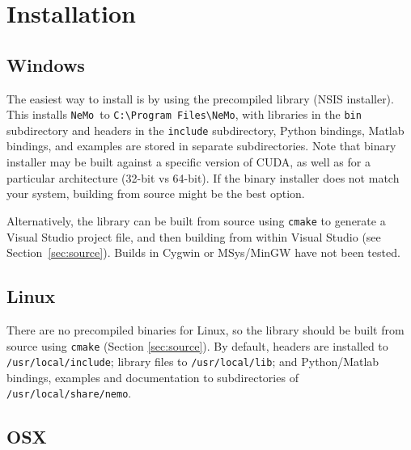 \documentclass[a4paper]{article}
\newcommand{\nemo}{\texttt{NeMo}\xspace}
\newcommand{\command}[1]{\texttt{#1}}
\newcommand{\file}[1]{\texttt{#1}}
\newcommand{\directory}[1]{\texttt{#1}}
\begin{document}
\newpage

\section{Installation}
\label{installation}

\subsection{Windows}
\label{installation:windows}

The easiest way to install is by using the precompiled library (NSIS
installer).  This installs \nemo\ to \directory{C:\textbackslash Program
Files\textbackslash NeMo}, with libraries in the \directory{bin} subdirectory
and headers in the \directory{include} subdirectory, Python bindings, Matlab
bindings, and examples are stored in separate subdirectories.  Note that binary
installer may be built against a specific version of CUDA, as well as for a
particular architecture (32-bit vs 64-bit).  If the binary installer does not
match your system, building from source might be the best option. 

Alternatively, the library can be built from source using \command{cmake} to
generate a Visual Studio project file, and then building from within Visual
Studio (see Section~\ref{sec:source}).  Builds in Cygwin or MSys/MinGW have
not been tested.

\subsection{Linux}

There are no precompiled binaries for Linux, so the library should be built
from source using \command{cmake} (Section \ref{sec:source}). By default,
headers are installed to \file{/usr/local/include}; library files to
\file{/usr/local/lib}; and Python/Matlab bindings, examples and
documentation to subdirectories of \directory{/usr/local/share/nemo}.

\subsection{OSX}
\end{document}
